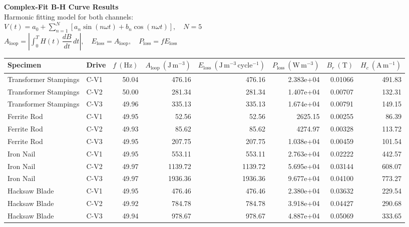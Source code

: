 \documentclass[varwidth=24cm,border=8pt]{standalone}
\begin{document}
\begin{minipage}{23cm}
\centering
{\Large \textbf{Complex-Fit B-H Curve Results}}\\[0.4em]
{\small Harmonic fitting model for both channels: }\\[0.2em]
{\small $V(t)=a_0+\sum_{n=1}^{N}\left[a_n\sin(n\omega t)+b_n\cos(n\omega t)\right],\quad N=5$}\\[0.5em]
{\small $A_{\mathrm{loop}}=\left|\int_0^T H(t)\,\dfrac{dB}{dt}\,dt\right|,\quad E_{\mathrm{loss}}=A_{\mathrm{loop}},\quad P_{\mathrm{loss}}=fE_{\mathrm{loss}}$}\\[0.7em]
\renewcommand{\arraystretch}{1.2}
\begin{tabular}{llrrrrrr}
\toprule
Specimen & Drive & $f~(\mathrm{Hz})$ & $A_{\mathrm{loop}}~(\mathrm{J\,m^{-3}})$ & $E_{\mathrm{loss}}~(\mathrm{J\,m^{-3}\,cycle^{-1}})$ & $P_{\mathrm{loss}}~(\mathrm{W\,m^{-3}})$ & $B_r~(\mathrm{T})$ & $H_c~(\mathrm{A\,m^{-1}})$ \\
\midrule
 Transformer Stampings & C-V1 & 50.04 & 476.16 & 476.16 & 2.383e+04 & 0.01066 & 491.83 \\
 Transformer Stampings & C-V2 & 50.00 & 281.34 & 281.34 & 1.407e+04 & 0.00707 & 132.31 \\
 Transformer Stampings & C-V3 & 49.96 & 335.13 & 335.13 & 1.674e+04 & 0.00791 & 149.15 \\
 Ferrite Rod & C-V1 & 49.95 & 52.56 & 52.56 & 2625.15 & 0.00255 & 86.39 \\
 Ferrite Rod & C-V2 & 49.93 & 85.62 & 85.62 & 4274.97 & 0.00328 & 113.72 \\
 Ferrite Rod & C-V3 & 49.95 & 207.75 & 207.75 & 1.038e+04 & 0.00459 & 101.54 \\
 Iron Nail & C-V1 & 49.95 & 553.11 & 553.11 & 2.763e+04 & 0.02222 & 442.57 \\
 Iron Nail & C-V2 & 49.97 & 1139.72 & 1139.72 & 5.695e+04 & 0.03144 & 608.07 \\
 Iron Nail & C-V3 & 49.97 & 1936.36 & 1936.36 & 9.677e+04 & 0.04100 & 773.27 \\
 Hacksaw Blade & C-V1 & 49.95 & 476.46 & 476.46 & 2.380e+04 & 0.03632 & 229.54 \\
 Hacksaw Blade & C-V2 & 49.92 & 784.78 & 784.78 & 3.918e+04 & 0.04427 & 290.68 \\
 Hacksaw Blade & C-V3 & 49.94 & 978.67 & 978.67 & 4.887e+04 & 0.05069 & 333.65 \\
\bottomrule
\end{tabular}
\end{minipage}
\end{document}
